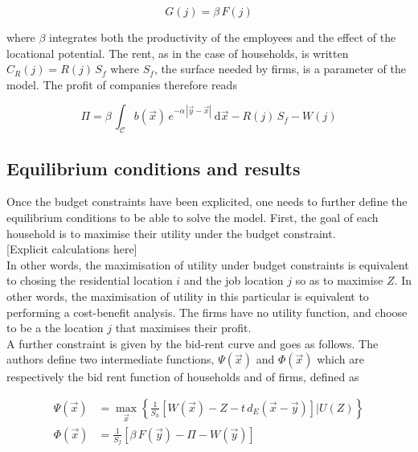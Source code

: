 \begin{equation}
    G(j) = \beta\,F(j)
\end{equation}

where $\beta$ integrates both the productivity of the employees and the effect
of the locational potential. The rent, as
in the case of households, is written $C_R(j) = R(j)\,S_f$ where $S_f$, the
surface needed by firms, is a parameter of the model. The profit
of companies therefore reads

\begin{equation}
    \Pi = \beta\, \int_{\mathcal{C}} b(\vec{x})\,e^{-\alpha\,\left|\vec{y}-\vec{x}\right|}\:\mathrm{d}\vec{x}
        - R\left(j\right)\,S_f
        - W\left(j\right)
\end{equation}


\subsection{Equilibrium conditions and results}
\label{sub:equilibrium_conditions}

Once the budget constraints have been explicited, one needs to further define
the equilibrium conditions to be able to solve the model. First, the goal of
each household is to maximise their utility under the budget constraint.\\

[Explicit calculations here]\\

In other words, the maximisation of utility under budget constraints is
equivalent to chosing the residential location $i$ and the job location $j$ so
as to maximise $Z$. In other words, the maximisation of utility in this
particular is equivalent to performing a cost-benefit analysis. The firms have
no utility function, and choose to be a the location $j$ that maximises their
profit.\\

A further constraint is given by the bid-rent curve and goes as follows. The authors define two intermediate functions, $\Psi(\vec{x})$ and $\Phi(\vec{x})$ which are
respectively the bid rent function of households and of firms, defined as

\begin{align}
    \Psi\left(\vec{x}\right) &= \max_{\vec{x}} \left\{ \frac{1}{S_h} \left[W(\vec{x} ) - Z -
    t\,d_E\left(\vec{x}-\vec{y}\right)\right] | U(Z)\right\}\\
    \Phi\left(\vec{x}\right) &= \frac{1}{S_f} \left[\beta\,F(\vec{y}) - \Pi -
W(\vec{y})\right]
\end{align}

